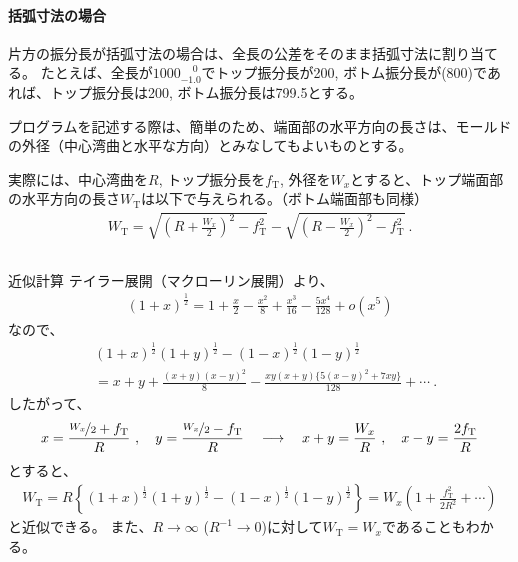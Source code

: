 \paragraph*{括弧寸法の場合}
片方の振分長が括弧寸法の場合は、全長の公差をそのまま括弧寸法に割り当てる。
たとえば、全長が$1000^{\phantom +0}_{-1.0}$でトップ振分長が200, ボトム振分長が(800)であれば、トップ振分長は200, ボトム振分長は799.5とする。




プログラムを記述する際は、簡単のため、端面部の水平方向の長さは、モールドの外径（中心湾曲と水平な方向）とみなしてもよいものとする。

実際には、中心湾曲を$R$, トップ振分長を$f_\mathrm T$, 外径を$W_x$とすると、トップ端面部の水平方向の長さ$W_\mathrm T$は以下で与えられる。（ボトム端面部も同様）
\begin{align*}
  W_\mathrm T
  = \sqrt{\left(R+\frac{W_x}2\right)^{\!2}-f_\mathrm T^2}
    -\sqrt{\left(R-\frac{W_x}2\right)^{\!2}-f_\mathrm T^2}\ .
\end{align*}
\begin{Column}{近似計算}
テイラー展開（マクローリン展開）より、
\begin{align*}
  (1+x)^\frac12 = 1+\frac x2-\frac{x^2}8+\frac{x^3}{16}-\frac{5x^4}{128}+o\!\left(x^5\right)
\end{align*}
なので、
\begin{align*}
  & (1+x)^\frac12(1+y)^\frac12-(1-x)^\frac12(1-y)^\frac12\\
  &= x+y+\frac{(x+y)(x-y)^2}8-\frac{xy(x+y)\big\{5(x-y)^2+7xy\big\}}{128}+\cdots\ .
\end{align*}
したがって、
\begin{align*}
  x = \frac{\nicefrac{W_x}2+f_\mathrm T}R\ ,\quad y = \frac{\nicefrac{W_x}2-f_\mathrm T}R\quad
  \longrightarrow \quad
  x+y = \frac{W_x}R\ , \quad x-y = \frac{2f_\mathrm T}R
\end{align*}
とすると、
\begin{align*}
  W_\mathrm T
  = R\left\{(1+x)^\frac12(1+y)^\frac12-(1-x)^\frac12(1-y)^\frac12\right\}
  = W_x\!\left(1+\frac{f_\mathrm T^2}{2R^2}+\cdots\right)
\end{align*}
と近似できる。
また、$R\to\infty$ ($R^{-1}\to0$)に対して$W_\mathrm T = W_x$であることもわかる。
\end{Column}


